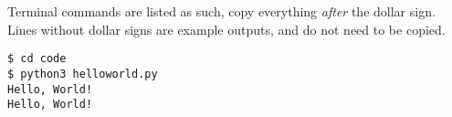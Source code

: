 Terminal commands are listed as such, copy everything \textit{after} the dollar sign. Lines without dollar signs are example outputs, and do not need to be copied.
			
\begin{lstlisting}
$ cd code
$ python3 helloworld.py 
Hello, World!
Hello, World!
\end{lstlisting}